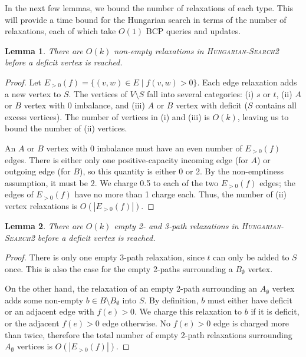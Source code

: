\documentclass[11pt]{article}
\def\eps{\varepsilon}
\theoremstyle{plain}
\newtheorem{lemma}{Lemma}
\begin{document}




In the next few lemmas, we bound the number of relaxations of each type.
This will provide a time bound for the Hungarian search in terms of the
number of relaxations, each of which take $O(1)$ BCP queries and updates.

\begin{lemma}
\label{lemma:goldberg_hs_length1}
	There are $O(k)$ non-empty relaxations in \textsc{Hungarian-Search2} 
	before a deficit vertex is reached.
\end{lemma}
\begin{proof}
	Let $E_{>0}(f) = \{(v, w) \in E \mid f(v, w) > 0\}$.
	Each edge relaxation adds a new vertex to $S$.
	The vertices of $V \setminus S$ fall into several categories: 
	(i) $s$ or $t$, (ii) $A$ or $B$ vertex with 0 imbalance, and (iii) $A$ 
	or $B$ vertex with deficit ($S$ contains all excess vertices).
	The number of vertices in (i) and (iii) is $O(k)$, leaving us to bound
	the number of (ii) vertices.

	An $A$ or $B$ vertex with 0 imbalance must have an even number of 
	$E_{>0}(f)$ edges.
	There is either only one positive-capacity incoming edge (for $A$) or 
	outgoing edge (for $B$), so this quantity is either 0 or 2.
	By the non-emptiness assumption, it must be 2.
	We charge 0.5 to each of the two $E_{>0}(f)$ edges;
	the edges of $E_{>0}(f)$ have no more than 1 charge each.
	Thus, the number of (ii) vertex relaxations is $O(|E_{>0}(f)|)$.
\end{proof}

\begin{lemma}
\label{lemma:goldberg_hs_length2}
	There are $O(k)$ empty 2- and 3-path relaxations in 
	\textsc{Hungarian-Search2} before a deficit vertex is reached.
\end{lemma}
\begin{proof}
	There is only one empty 3-path relaxation, since $t$ can only be added 
	to $S$ once.
	This is also the case for the empty 2-paths surrounding a $B_\emptyset$
	vertex.

	On the other hand, the relaxation of an empty 2-path surrounding an 
	$A_\emptyset$ vertex adds some non-empty 
	$b \in B \setminus B_\emptyset$ into $S$.
	By definition, $b$ must either have deficit or an adjacent edge with 
	$f(e) > 0$.
	We charge this relaxation to $b$ if it is deficit, or the adjacent 
	$f(e) > 0$ edge otherwise.
	No $f(e) > 0$ edge is charged more than twice, therefore the total 
	number of empty 2-path relaxations surrounding $A_\emptyset$ vertices
	is $O(|E_{>0}(f)|)$.
\end{proof}
\end{document}
